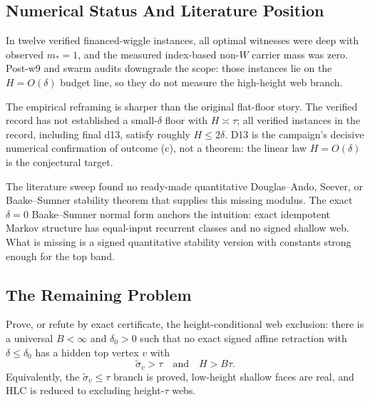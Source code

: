 \subsection{Numerical Status And Literature Position}

\begin{numericalresult}
\numbadge
In twelve verified financed-wiggle instances, all optimal witnesses were
deep with observed \(m_*=1\), and the measured index-based non-\(W\) carrier
mass was zero.  Post-w9 and swarm audits downgrade the scope: those instances
lie on the \(H=O(\delta)\) budget line, so they do not measure the
high-height web branch.
\end{numericalresult}

The empirical reframing is sharper than the original flat-floor story.  The
verified record has not established a small-\(\delta\) floor with
\(H\asymp\tau\); all verified instances in the record, including final d13,
satisfy roughly \(H\le2\delta\).  D13 is the campaign's decisive numerical
confirmation of outcome (c), not a theorem: the linear law \(H=O(\delta)\) is
the conjectural target.

The literature sweep found no ready-made quantitative Douglas--Ando,
Seever, or Baake--Sumner stability theorem that supplies this missing
modulus.  The exact \(\delta=0\) Baake--Sumner normal form anchors the
intuition: exact idempotent Markov structure has equal-input recurrent
classes and no signed shallow web.  What is missing is a signed quantitative
stability version with constants strong enough for the top band.

\subsection{The Remaining Problem}

\begin{openproblem}
\openbadge
Prove, or refute by exact certificate, the height-conditional web exclusion:
there is a universal \(B<\infty\) and \(\delta_0>0\) such that no exact signed
affine retraction with \(\delta\le\delta_0\) has a hidden top vertex \(v\)
with
\[
  \boxed{\widetilde\sigma_v>\tau\quad\text{and}\quad H>B\tau .}
\]
Equivalently, the \(\widetilde\sigma_v\le\tau\) branch is proved, low-height
shallow faces are real, and HLC is reduced to excluding height-\(\tau\) webs.
\end{openproblem}
